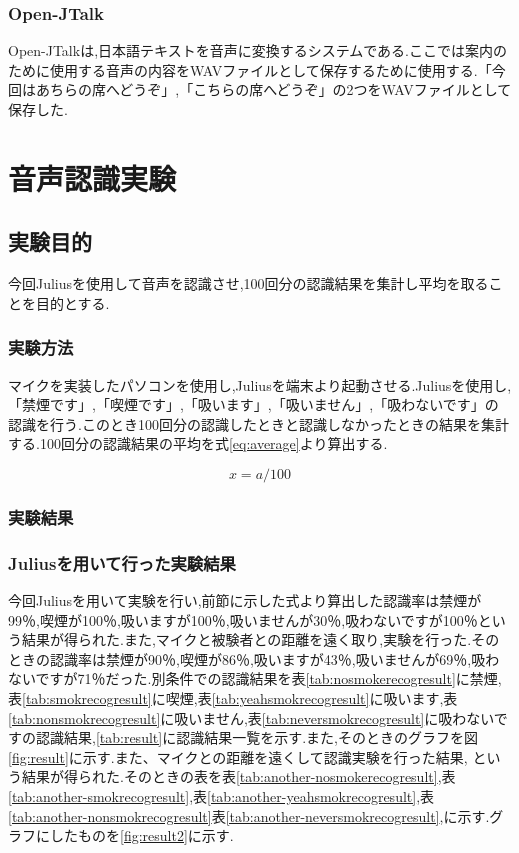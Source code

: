 \documentclass[12pt,oneside]{sotsuken_paper}
\begin{document}
\subsection{Open-JTalk}
Open-JTalkは,日本語テキストを音声に変換するシステムである.ここでは案内のために使用する音声の内容をWAVファイルとして保存するために使用する.「今回はあちらの席へどうぞ」,「こちらの席へどうぞ」の2つをWAVファイルとして保存した.


\chapter{音声認識実験}
\section{実験目的}
今回Juliusを使用して音声を認識させ,100回分の認識結果を集計し平均を取ることを目的とする.


\subsection{実験方法}
マイクを実装したパソコンを使用し,Juliusを端末より起動させる.Juliusを使用し,「禁煙です」,「喫煙です」,「吸います」,「吸いません」,「吸わないです」の認識を行う.このとき100回分の認識したときと認識しなかったときの結果を集計する.100回分の認識結果の平均を式\ref{eq:average}より算出する.

\begin{equation}
  x = a / 100
\end{equation}
\label{eq:average}


\subsection{実験結果}
\subsection{Juliusを用いて行った実験結果}
今回Juliusを用いて実験を行い,前節に示した式より算出した認識率は禁煙が99％,喫煙が100％,吸いますが100％,吸いませんが30％,吸わないですが100％という結果が得られた.また,マイクと被験者との距離を遠く取り,実験を行った.そのときの認識率は禁煙が90％,喫煙が86％,吸いますが43％,吸いませんが69％,吸わないですが71％だった.別条件での認識結果を表\ref{tab:nosmokerecogresult}に禁煙,表\ref{tab:smokrecogresult}に喫煙,表\ref{tab:yeahsmokrecogresult}に吸います,表\ref{tab:nonsmokrecogresult}に吸いません,表\ref{tab:neversmokrecogresult}に吸わないですの認識結果,\ref{tab:result}に認識結果一覧を示す.また,そのときのグラフを図\ref{fig:result}に示す.また、マイクとの距離を遠くして認識実験を行った結果, という結果が得られた.そのときの表を表\ref{tab:another-nosmokerecogresult},表\ref{tab:another-smokrecogresult},表\ref{tab:another-yeahsmokrecogresult},表\ref{tab:another-nonsmokrecogresult}表\ref{tab:another-neversmokrecogresult},に示す.グラフにしたものを\ref{fig:result2}に示す.
\end{document}
